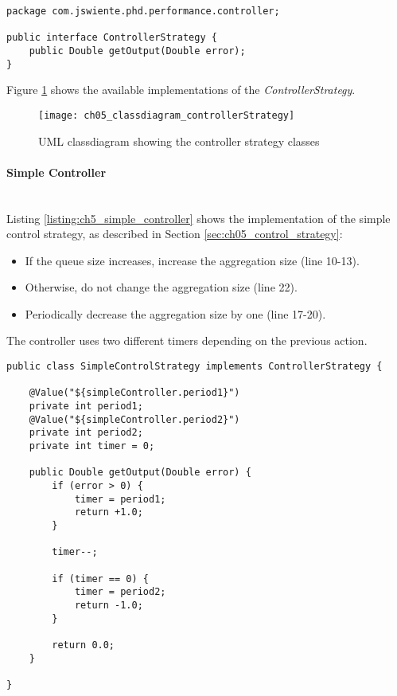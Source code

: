 \begin{lstlisting}[caption={ControllerStrategy Interface},label=listing:ch5_controller_strategy]
package com.jswiente.phd.performance.controller;

public interface ControllerStrategy {
	public Double getOutput(Double error);
}
\end{lstlisting}

Figure \ref{fig:ch05_classdiagram_controllerStrategy} shows the available implementations of the \emph{ControllerStrategy}.

\begin{figure}[htbp]
	\centering
	\texttt{[image: ch05\_classdiagram\_controllerStrategy]}
	\caption{\ac{UML} classdiagram showing the controller strategy classes}
	\label{fig:ch05_classdiagram_controllerStrategy}
\end{figure}

\paragraph{Simple Controller}\mbox{}\\

Listing \ref{listing:ch5_simple_controller} shows the implementation of the simple control strategy, as described in Section \ref{sec:ch05_control_strategy}:
\begin{itemize}
	\item If the queue size increases, increase the aggregation size (line 10-13).
	\item Otherwise, do not change the aggregation size (line 22).
	\item Periodically decrease the aggregation size by one (line 17-20).
\end{itemize}

The controller uses two different timers depending on the previous action.

\begin{lstlisting}[caption={Implementation of the simple control strategy},label=listing:ch5_simple_controller]
public class SimpleControlStrategy implements ControllerStrategy {

	@Value("${simpleController.period1}")
	private int period1;
	@Value("${simpleController.period2}")
	private int period2;
	private int timer = 0;
	
	public Double getOutput(Double error) {
		if (error > 0) {
			timer = period1;
			return +1.0;
		}

		timer--;
		
		if (timer == 0) {
			timer = period2;
			return -1.0;
		}
		
		return 0.0;
	}

}	
\end{lstlisting}

